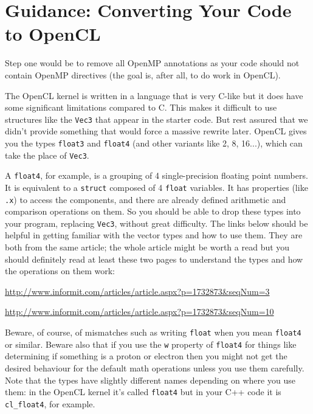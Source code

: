 \documentclass[letterpaper,10pt]{article}
\begin{document}
\section*{Guidance: Converting Your Code to OpenCL}

Step one would be to remove all OpenMP annotations as your code should not contain
OpenMP directives (the goal is, after all, to do work in OpenCL).

The OpenCL kernel is written in a language that is very C-like but it does have some
significant limitations compared to C. This makes it difficult to use 
structures like the \texttt{Vec3} that appear in the starter code. But rest 
assured that we didn't provide something that would force a massive 
rewrite later. OpenCL gives you the types \texttt{float3} and \texttt{float4} (and other variants like 2, 8, 16...), which can take the place of \texttt{Vec3}.

A \texttt{float4}, for example, is a grouping of 4 single-precision floating point numbers. It is
equivalent to a \texttt{struct} composed of 4 \texttt{float} variables. It has
properties (like \texttt{.x}) to access the components, and there are already
defined arithmetic and comparison operations on them. So you should be able to drop
these types into your program, replacing \texttt{Vec3}, without great difficulty.
The links below should be helpful in getting familiar with the vector types and how 
to use them. They are both from the same article; the whole article might be worth a 
read but you should definitely read at least these two pages to understand the 
types and how the operations on them work:

\begin{center}

\url{http://www.informit.com/articles/article.aspx?p=1732873&seqNum=3}

\url{http://www.informit.com/articles/article.aspx?p=1732873&seqNum=10}

\end{center}

Beware, of course, of mismatches such as writing \texttt{float} when you mean 
\texttt{float4} or similar. Beware also that if you use the \texttt{w} property 
of \texttt{float4} for things like determining if something is a proton or electron 
then you might not get the desired behaviour for the default math operations unless
you use them carefully. 
Note that the types have slightly different names 
depending on where you use them: in the OpenCL kernel it's called
\texttt{float4} but in your C++ code it is \texttt{cl\_float4}, for example. 
\end{document}

